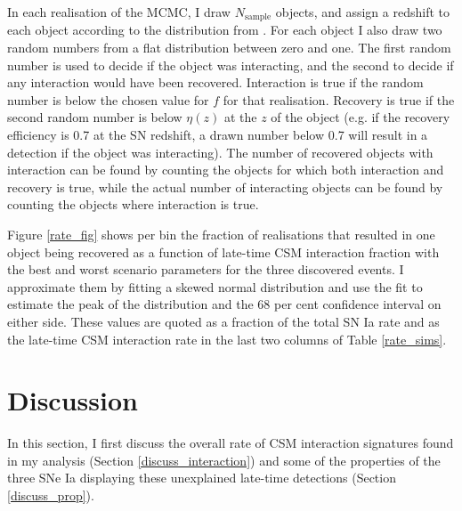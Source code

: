 \documentclass[a4paper,oneside,12pt, class=Latex/Classes/PhDthesisPSnPDF, crop=false]{standalone}
\begin{document}
In each realisation of the MCMC, I draw $N_\text{sample}$ objects, and assign a redshift to each object according to the distribution from \citet{SNIa_rate}. For each object I also draw two random numbers from a flat distribution between zero and one. The first random number is used to decide if the object was interacting, and the second to decide if any interaction would have been recovered. Interaction is true if the random number is below the chosen value for $f$ for that realisation. Recovery is true if the second random number is below $\eta(z)$ at the $z$ of the object (e.g. if the recovery efficiency is 0.7 at the SN redshift, a drawn number below 0.7 will result in a detection if the object was interacting). The number of recovered objects with interaction can be found by counting the objects for which both interaction and recovery is true, while the actual number of interacting objects can be found by counting the objects where interaction is true.

Figure \ref{rate_fig} shows per bin the fraction of realisations that resulted in one object being recovered as a function of late-time CSM interaction fraction with the best and worst scenario parameters for the three discovered events. I approximate them by fitting a skewed normal distribution and use the fit to estimate the peak of the distribution and the 68 per cent confidence interval on either side. These values are quoted as a fraction of the total SN Ia rate and as the late-time CSM interaction rate in the last two columns of Table \ref{rate_sims}.


\section{Discussion}
\label{DR2_discussion}
In this section, I first discuss the overall rate of CSM interaction signatures found in my analysis (Section \ref{discuss_interaction}) and some of the properties of the three SNe Ia displaying these unexplained late-time detections (Section \ref{discuss_prop}). 
\end{document}
